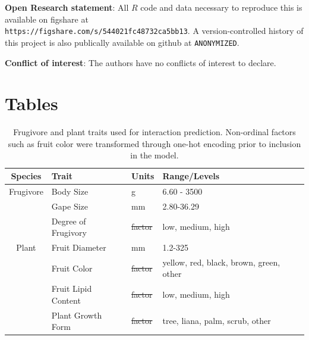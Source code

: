 \documentclass[num-refs]{article}%
\providecommand{\DIFadd}[1]{{\protect\color{blue}\uwave{#1}}} %
\providecommand{\DIFdel}[1]{{\protect\color{red}\sout{#1}}}                      %
\providecommand{\DIFaddFL}[1]{\DIFadd{#1}} %
\providecommand{\DIFdelFL}[1]{\DIFdel{#1}} %
\providecommand{\DIFaddbeginFL}{} %
\providecommand{\DIFaddendFL}{} %
\providecommand{\DIFdelbeginFL}{} %
\providecommand{\DIFdelendFL}{} %
\newcommand{\DIFscaledelfig}{0.5}
\newlength{\DIFdelgraphicswidth} %
\newlength{\DIFdelgraphicsheight} %
\newcommand{\DIFaddincludegraphics}[2][]{{\color{blue}\fbox{\DIFOincludegraphics[#1]{#2}}}} %
\newcommand{\DIFdelincludegraphics}[2][]{%
\sbox{\DIFdelgraphicsbox}{\DIFOincludegraphics[#1]{#2}}%
\settoboxwidth{\DIFdelgraphicswidth}{\DIFdelgraphicsbox} %
\settoboxtotalheight{\DIFdelgraphicsheight}{\DIFdelgraphicsbox} %
\scalebox{\DIFscaledelfig}{%
\parbox[b]{\DIFdelgraphicswidth}{\usebox{\DIFdelgraphicsbox}\\[-\baselineskip] \rule{\DIFdelgraphicswidth}{0em}}\llap{\resizebox{\DIFdelgraphicswidth}{\DIFdelgraphicsheight}{%
\setlength{\unitlength}{\DIFdelgraphicswidth}%
\begin{picture}(1,1)%
\thicklines\linethickness{2pt} %
{\color[rgb]{1,0,0}\put(0,0){\framebox(1,1){}}}%
{\color[rgb]{1,0,0}\put(0,0){\line( 1,1){1}}}%
{\color[rgb]{1,0,0}\put(0,1){\line(1,-1){1}}}%
\end{picture}%
}\hspace*{3pt}}} %
} %
\DeclareRobustCommand{\DIFaddbeginFL}{\DIFOaddbeginFL \let\includegraphics\DIFaddincludegraphics} %
\DeclareRobustCommand{\DIFaddendFL}{\DIFOaddendFL \let\includegraphics\DIFOincludegraphics} %
\DeclareRobustCommand{\DIFdelbeginFL}{\DIFOdelbeginFL \let\includegraphics\DIFdelincludegraphics} %
\DeclareRobustCommand{\DIFdelendFL}{\DIFOaddendFL \let\includegraphics\DIFOincludegraphics} %
\begin{document}
\noindent \textbf{Open Research statement}: All $R$ code and data necessary to reproduce this is available on figshare at \\ \texttt{https://figshare.com/s/544021fc48732ca5bb13}. A version-controlled history of this project is also publically available on github at \texttt{ANONYMIZED}.

\noindent \textbf{Conflict of interest}: The authors have no conflicts of interest to declare.



\clearpage



\clearpage 

\section*{Tables} 


\begin{table}[!h]
\caption{Frugivore and plant traits used for interaction prediction. Non-ordinal factors such as fruit color were transformed through one-hot encoding prior to inclusion in the model.}
\DIFaddbeginFL \vspace{20pt}
\DIFaddendFL \label{tab:traits}
\begin{tabular}{clll} 
 \hline
 Species & Trait & Units & Range/Levels \\  
 \hline
 \hline
Frugivore & Body Size &  g &  6.60 - 3500 \\
& Gape Size &   mm  & 2.80-36.29  \\  
& Degree of Frugivory &  \DIFdelbeginFL \DIFdelFL{factor   }\DIFdelendFL \DIFaddbeginFL \DIFaddFL{-   }\DIFaddendFL &  low, medium, high \\  
Plant & Fruit Diameter &  mm  & 1.2-325  \\
& Fruit Color &  \DIFdelbeginFL \DIFdelFL{factor  }\DIFdelendFL \DIFaddbeginFL \DIFaddFL{-  }\DIFaddendFL & yellow, red, black, brown, green, other \\
& Fruit Lipid Content &  \DIFdelbeginFL \DIFdelFL{factor   }\DIFdelendFL \DIFaddbeginFL \DIFaddFL{-   }\DIFaddendFL &  low, medium, high  \\ 
& Plant Growth Form &   \DIFdelbeginFL \DIFdelFL{factor  }\DIFdelendFL \DIFaddbeginFL \DIFaddFL{-  }\DIFaddendFL &  tree, liana, palm, scrub, other \\ 
 \hline
\end{tabular}
\end{table}


\clearpage 
\end{document}
